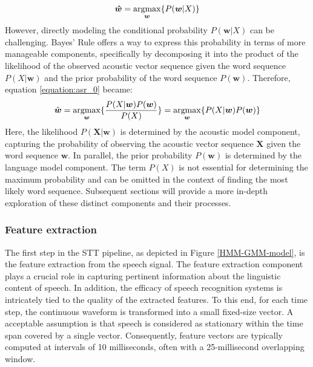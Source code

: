 \begin{equation} \label{equation:asr_0}
    \boldsymbol{\hat{w}} = \operatorname*{argmax}_{\boldsymbol{w}} \{P(\boldsymbol{w}|X)\}
\end{equation}
However, directly modeling the conditional probability $P(\boldsymbol{w}|X)$ can be challenging. Bayes' Rule offers a way to express this probability in terms of more manageable components, specifically by decomposing it into the product of the likelihood of the observed acoustic vector sequence given the word sequence $P(X|\boldsymbol{w})$ and the prior probability of the word sequence $P(\boldsymbol{w})$. Therefore, equation \ref{equation:asr_0} became:
\begin{equation}  \label{equation:asr}
    \hat{\boldsymbol{w}} = \operatorname*{argmax}_{\boldsymbol{w}} \{\frac{P(X|\boldsymbol{w})P(\boldsymbol{w})}{P(X)}\} =\operatorname*{argmax}_{\boldsymbol{w}} \{P(X|\boldsymbol{w})P(\boldsymbol{w})\}
\end{equation}
Here, the likelihood $P(\boldsymbol{X}|\boldsymbol{w})$ is determined by the acoustic model component, capturing the probability of observing the acoustic vector sequence $\boldsymbol{X}$ given the word sequence $\boldsymbol{w}$. In parallel, the prior probability $P(\boldsymbol{w})$ is determined by the language model component. The term $P(X)$ is not essential for determining the maximum probability and can be omitted in the context of finding the most likely word sequence. Subsequent sections will provide a more in-depth exploration of these distinct components and their processes.


\subsubsection{Feature extraction}%
\label{subsection:features}
The first step in the \ac{STT} pipeline, as depicted in Figure \ref{HMM-GMM-model}, is the feature extraction from the speech signal.
The feature extraction component plays a crucial role in capturing pertinent information about the linguistic content of speech. In addition, the efficacy of speech recognition systems is intricately tied to the quality of the extracted features.
To this end, for each time step, the continuous waveform is transformed into a small fixed-size vector. A acceptable assumption is that speech is considered as stationary within the time span covered by a single vector. Consequently, feature vectors are typically computed at intervals of 10 milliseconds, often with a 25-millisecond overlapping window.

